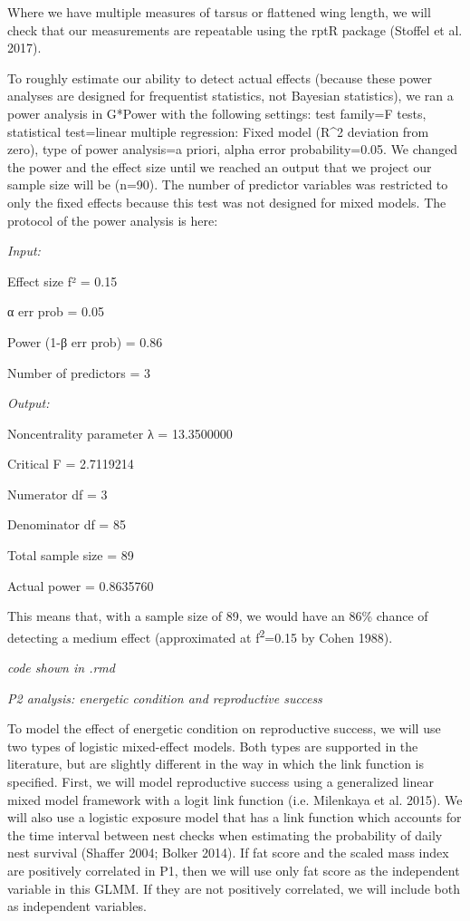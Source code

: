 \documentclass[
]{article}
\begin{document}
Where we have multiple measures of tarsus or flattened wing length, we
will check that our measurements are repeatable using the rptR package
(Stoffel et al. 2017).

To roughly estimate our ability to detect actual effects (because these
power analyses are designed for frequentist statistics, not Bayesian
statistics), we ran a power analysis in G*Power with the following
settings: test family=F tests, statistical test=linear multiple
regression: Fixed model (R\^{}2 deviation from zero), type of power
analysis=a priori, alpha error probability=0.05. We changed the power
and the effect size until we reached an output that we project our
sample size will be (n=90). The number of predictor variables was
restricted to only the fixed effects because this test was not designed
for mixed models. The protocol of the power analysis is here:

\emph{Input:}

Effect size f² = 0.15

α err prob = 0.05

Power (1-β err prob) = 0.86

Number of predictors = 3

\emph{Output:}

Noncentrality parameter λ = 13.3500000

Critical F = 2.7119214

Numerator df = 3

Denominator df = 85

Total sample size = 89

Actual power = 0.8635760

This means that, with a sample size of 89, we would have an 86\% chance
of detecting a medium effect (approximated at f\textsuperscript{2}=0.15
by Cohen 1988).

\emph{code shown in .rmd}

\emph{P2 analysis: energetic condition and reproductive success}

To model the effect of energetic condition on reproductive success, we
will use two types of logistic mixed-effect models. Both types are
supported in the literature, but are slightly different in the way in
which the link function is specified. First, we will model reproductive
success using a generalized linear mixed model framework with a logit
link function (i.e. Milenkaya et al. 2015). We will also use a logistic
exposure model that has a link function which accounts for the time
interval between nest checks when estimating the probability of daily
nest survival (Shaffer 2004; Bolker 2014). If fat score and the scaled
mass index are positively correlated in P1, then we will use only fat
score as the independent variable in this GLMM. If they are not
positively correlated, we will include both as independent variables.
\end{document}
